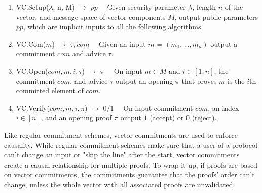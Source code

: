 \begin{enumerate}

  \item VC.Setup(\(\lambda\), n, M) \(\rightarrow\) \(pp\quad\) Given security parameter \(\lambda\), length \(n\) of the vector, and message space of vector components \(M\), output public parameters \(pp\), which are implicit inputs to all the following algorithms.

  \item VC.Com(\(m\)) \(\rightarrow\) \(\tau, com\quad\) Given an input \(m\) = \((m_1, ..., m_n)\) output a commitment \(com\) and advice \(\tau\).

  \item VC.Open(\(com, m, i, \tau\)) \(\rightarrow\) \(\pi\quad\) On input \(m \in M\) and \(i \in [1, n]\), the commitment \(com\), and advice \(\tau\) output an opening \(\pi\) that proves \(m\) is the \(i\)th committed element of \(com\).

  \item VC.Verify(\(com, m, i, \pi\)) \(\rightarrow\) \(0/1\quad\) On input commitment \(com\), an index \(i \in [n]\), and an opening proof \(\pi\) output \(1\) (accept) or \(0\) (reject).

\end{enumerate}

Like regular commitment schemes, vector commitments are used to enforce causality. While regular commitment schemes make sure that a user of a protocol can't change an input or "skip the line" after the start, vector commitments create a causal relationship for multiple proofs. To wrap it up, if proofs are based on vector commitments, the commitments guarantee that the proofs' order can't change, unless the whole vector with all associated proofs are unvalidated.

